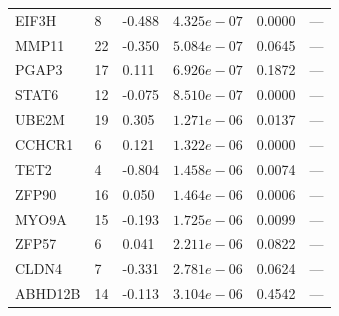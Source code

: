 \begin{longtable}{llllll}
  EIF3H & 8 & -0.488 & $4.325e-07$ & 0.0000 & --- \\
  MMP11 & 22 & -0.350 & $5.084e-07$ & 0.0645 & --- \\
  PGAP3 & 17 & 0.111 & $6.926e-07$ & 0.1872 & --- \\
  STAT6 & 12 & -0.075 & $8.510e-07$ & 0.0000 & --- \\
  UBE2M & 19 & 0.305 & $1.271e-06$ & 0.0137 & --- \\
  CCHCR1 & 6 & 0.121 & $1.322e-06$ & 0.0000 & --- \\
  TET2 & 4 & -0.804 & $1.458e-06$ & 0.0074 & --- \\
  ZFP90 & 16 & 0.050 & $1.464e-06$ & 0.0006 & --- \\
  MYO9A & 15 & -0.193 & $1.725e-06$ & 0.0099 & --- \\
  ZFP57 & 6 & 0.041 & $2.211e-06$ & 0.0822 & --- \\
  CLDN4 & 7 & -0.331 & $2.781e-06$ & 0.0624 & --- \\
  ABHD12B & 14 & -0.113 & $3.104e-06$ & 0.4542 & --- \\
\end{longtable}

